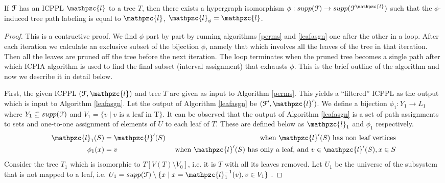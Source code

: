 \documentclass[a4paper,UKenglish,numberwithinsect]{lipics}
\def\cF{{\cal F}}
\def\cl{\mathpzc{l}}
\begin{document}
\begin{theorem}
\label{th:perm}
  If $\cF$ has an ICPPL $\cl$ to a tree $T$, then there exists a hypergraph
  isomorphism $\phi : supp(\cF) \rightarrow supp(\cF^\cl)$ such that
  the $\phi$-induced tree path labeling is equal to $\cl$, $\cl_\phi = \cl$.
\end{theorem}
\begin{proof} 
This is a contructive proof. We find $\phi$ part by part by
running algorithms \ref{perms} and \ref{leafasgn} one after the other
in a loop. After each iteration we calculate an exclusive subset of
the bijection $\phi$, namely that which involves all the leaves of the
tree in that iteration. Then all the leaves are pruned off the tree
before the next iteration. The loop terminates when the pruned tree
becomes a single path after which ICPIA algorithm is used to find the
final subset (interval assignment) that exhausts $\phi$. This is
the brief outline of the algorithm and now we describe it in detail
below.
  

\noindent
First, the given ICPPL $(\cF, \cl)$ and tree $T$ are given as input to
Algorithm \ref{perms}. This yields a ``filtered'' ICPPL as the output
which is input to Algorithm \ref{leafasgn}.  Let the output of
Algorithm \ref{leafasgn} be $(\cF',\cl')$. We define a bijection
$\phi_1: Y_1 \rightarrow L_1$ where $Y_1 \subseteq supp(\cF)$ and $V_1
= \{v \mid v \text{ is a leaf in } $T$\}$.  It can be observed that
the output of Algorithm \ref{leafasgn} is a set of path assignments to
sets and one-to-one assignment of elements of $U$ to each leaf of
$T$. These are defined below as $\cl_1$ and $\phi_1$ respectively.
\vspace{-3mm}
\begin{align*}
  \cl_1(S) &= \cl'(S) &\text{ when $\cl'(S)$ has non leaf vertices} \\
  \phi_1(x) &= v  &\text{ when $\cl'(S)$ has only a leaf, and } v \in \cl'(S), x \in S
\end{align*}
Consider the tree $T_1$ which is isomorphic to $T[V(T) \setminus
V_0]$, i.e. it is $T$ with all its leaves removed. Let $U_1$ be the
universe of the subsystem that is not mapped to a leaf, i.e. $U_1 =
supp(\cF) \setminus \{ x \mid x = \cl_1^{-1}(v), v \in V_1\}$ .


\end{proof}
\end{document}
